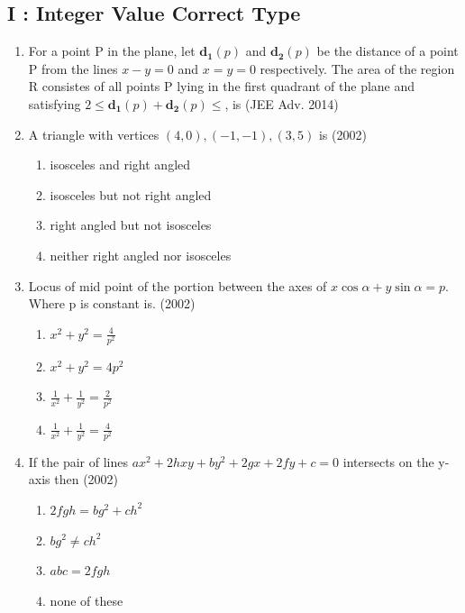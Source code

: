 \documentclass[12pt]{article}
\let\vec\mathbf
\begin{document}
\begin{enumerate}
\section*{I    :     Integer Value Correct Type }
\begin{enumerate}
		\fi
\item For a point P in the plane, let $\vec{d_1}(p)$ and $\vec{d_2}(p)$ be the distance of a point P
from the lines $x-y=0$ and $x=y=0$ respectively. The area of the region R consistes of all points P lying in the first quadrant of the plane and satisfying $2\leq \vec{d_1}(p)+\vec{d_2}(p)\leq$, is (JEE Adv. 2014)

\item A triangle with vertices $(4,0),(-1,-1 ),(3,5)$ is (2002)
\begin{enumerate}
\item isosceles and right angled
\item isosceles  but not right angled
\item right angled but not isosceles 
\item neither right angled nor isosceles 
\end{enumerate}
\item Locus of mid point of the portion between the axes of $x\cos\alpha+y\sin\alpha=p$. Where p is constant is. (2002)
\begin{enumerate}
\item $x^2+y^2=\frac{4}{p^2}$ 
\item $x^2+y^2=4p^2$
\item$\frac{1}{x^2}+\frac{1}{y^2}=\frac{2}{p^2}$ 
\item $\frac{1}{x^2}+\frac{1}{y^2}=\frac{4}{p^2}$ 
\end{enumerate}
\item If the pair of lines $ax^2+2hxy+by^2+2gx+2fy+c=0$ intersects on the y-axis then (2002)
\begin{enumerate}
\item $2fgh=bg^2+ch^2$ 
\item $bg^2\neq ch^2$
\item $abc=2fgh$
\item none of these
\end{enumerate}

\end{enumerate}
\end{enumerate}
\end{document}
